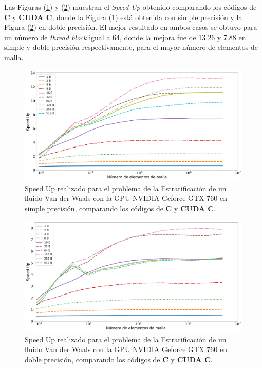 Las Figuras (\ref{fig:s_760_VdW_simple_10}) y (\ref{fig:s_760_VdW_double_10}) muestran el \textit{Speed Up} obtenido comparando los códigos de \textbf{C} y \textbf{CUDA C}, donde la Figura (\ref{fig:s_760_VdW_simple_10}) está obtenida con simple precisión y la Figura (\ref{fig:s_760_VdW_double_10}) en doble precisión. El mejor resultado en ambos casos se obtuvo para un número de \textit{thread block} igual a 64, donde la mejora fue de 13.26 y 7.88 en simple y doble precisión respectivamente, para el mayor número de elementos de malla.


\begin{figure}[h!]
	\centering
	\includegraphics[width=\textwidth]{figs/cap4/s_760_VdW_simple_10}
	\caption{Speed Up realizado para el problema de la Estratificación de un fluido Van der Waals con la GPU NVIDIA Geforce GTX 760 en simple precisión, comparando los códigos de \textbf{C} y \textbf{CUDA C}.} 
	\label{fig:s_760_VdW_simple_10}	
\end{figure}

\begin{figure}[h!]
	\centering
	\includegraphics[width=\textwidth]{figs/cap4/s_760_VdW_double_10}
	\caption{Speed Up realizado para el problema de la Estratificación de un fluido Van der Waals con la GPU NVIDIA Geforce GTX 760 en doble precisión, comparando los códigos de \textbf{C} y \textbf{CUDA C}.} 
	\label{fig:s_760_VdW_double_10}	
\end{figure}


